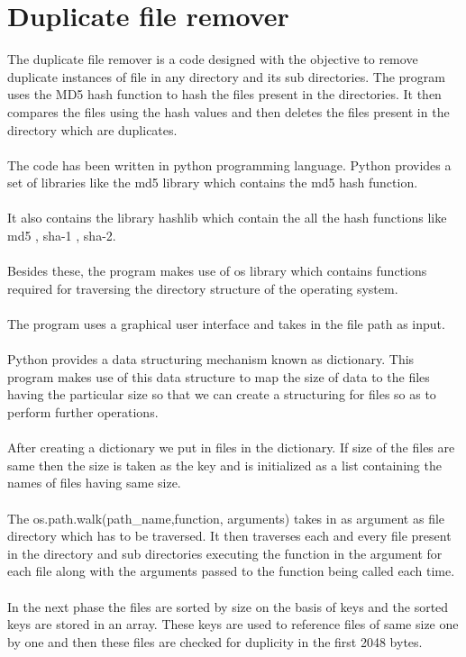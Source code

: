 \chapter{Duplicate file remover}

The duplicate file remover is a code designed with the objective to remove duplicate instances of file in any directory and its sub directories. The program uses the MD5 hash function to hash the files present in the directories. It then compares the files using the hash values and then deletes the files present in the directory which are duplicates. 
\\~\\
The code has been written in python programming language. Python provides a set of libraries like the md5 library which contains the md5 hash function.  
\\~\\It also contains the library hashlib which contain the all the hash functions like md5 , sha-1 , sha-2.
\\~\\Besides these, the program makes use of os library which contains functions required for traversing the directory structure of the operating system. 
\\~\\The program uses a graphical user interface and takes in the file path as input.\\~\\
Python provides a data structuring mechanism known as dictionary. This program makes use of this data structure to map the size of data to the files having the particular size so that we can create a structuring for files so as to perform further operations.\\~\\
After creating a dictionary we put in files in the dictionary. If size of the files are same then the size is taken as the key and is initialized as a list containing the names of files having same size.\\
\\
The os.path.walk(path\_name,function, arguments)  takes in as argument as file directory which has to be traversed. It then traverses each and every file present in the directory and sub directories executing the function in the argument for each file along with the arguments passed to the function being called each time.\\~\\
In the next phase the files are sorted by size on the basis of keys and the sorted keys are stored in an array. These keys are used to reference files of same size one by one and then these files are checked for duplicity in the first 2048 bytes.\\~\\
